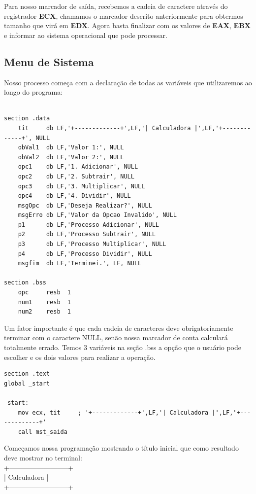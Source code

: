 Para nosso marcador de saída, recebemos a cadeia de caractere através do registrador \textbf{ECX}, chamamos o marcador descrito anteriormente para obtermos tamanho que virá em \textbf{EDX}. Agora basta finalizar com os valores de \textbf{EAX}, \textbf{EBX} e informar ao sistema operacional que pode processar.

\subsection{Menu de Sistema}

Nosso processo começa com a declaração de todas as variáveis que utilizaremos ao longo do programa:
\begin{lstlisting}[]
%include 'bibliotecaE.inc'

section .data
	tit     db LF,'+-------------+',LF,'| Calculadora |',LF,'+-------------+', NULL
	obVal1  db LF,'Valor 1:', NULL
	obVal2  db LF,'Valor 2:', NULL
	opc1    db LF,'1. Adicionar', NULL
	opc2    db LF,'2. Subtrair', NULL
	opc3    db LF,'3. Multiplicar', NULL
	opc4    db LF,'4. Dividir', NULL
	msgOpc  db LF,'Deseja Realizar?', NULL
	msgErro db LF,'Valor da Opcao Invalido', NULL
	p1      db LF,'Processo Adicionar', NULL
	p2      db LF,'Processo Subtrair', NULL
	p3      db LF,'Processo Multiplicar', NULL
	p4      db LF,'Processo Dividir', NULL
	msgfim  db LF,'Terminei.', LF, NULL

section .bss
	opc     resb  1
	num1    resb  1
	num2    resb  1
\end{lstlisting}

Um fator importante é que cada cadeia de caracteres deve obrigatoriamente terminar com o caractere NULL, senão nossa marcador de conta calculará totalmente errado. Temos 3 variáveis na seção .bss a opção que o usuário pode escolher e os dois valores para realizar a operação.

\begin{lstlisting}[]
section .text
global _start

_start:
	mov ecx, tit     ; '+-------------+',LF,'| Calculadora |',LF,'+-------------+'
	call mst_saida
\end{lstlisting}

Começamos nossa programação mostrando o título inicial que como resultado deve mostrar no terminal: \\
{\ttfamily +--------------------------+ } \\
{\ttfamily | Calculadora | } \\
{\ttfamily +--------------------------+ }

